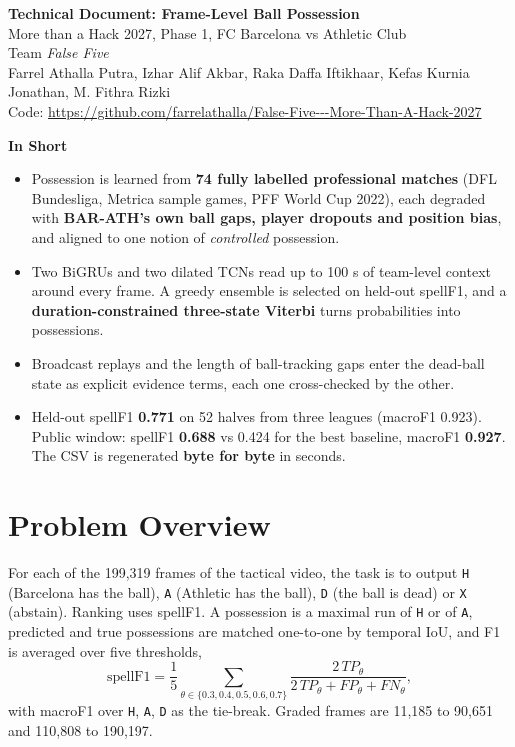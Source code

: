 \documentclass[10pt]{article}
\begin{document}
\begin{center}
{\Large \textbf{Technical Document: Frame-Level Ball Possession}}\\[3pt]
{\large More than a Hack 2027, Phase 1, FC Barcelona vs Athletic Club}\\[5pt]
Team \textit{False Five}\\[2pt]
Farrel Athalla Putra, Izhar Alif Akbar, Raka Daffa Iftikhaar, Kefas Kurnia Jonathan, M. Fithra Rizki\\[2pt]
\small Code: \url{https://github.com/farrelathalla/False-Five---More-Than-A-Hack-2027}
\end{center}

\begin{keybox}
\textbf{In Short}
\begin{itemize}[leftmargin=1.2em]
\item Possession is learned from \textbf{74 fully labelled professional matches} (DFL Bundesliga, Metrica sample games, PFF World Cup 2022), each degraded with \textbf{BAR-ATH's own ball gaps, player dropouts and position bias}, and aligned to one notion of \emph{controlled} possession.
\item Two BiGRUs and two dilated TCNs read up to 100 s of team-level context around every frame. A greedy ensemble is selected on held-out spellF1, and a \textbf{duration-constrained three-state Viterbi} turns probabilities into possessions.
\item Broadcast replays and the length of ball-tracking gaps enter the dead-ball state as explicit evidence terms, each one cross-checked by the other.
\item Held-out spellF1 \textbf{0.771} on 52 halves from three leagues (macroF1 0.923). Public window: spellF1 \textbf{0.688} vs 0.424 for the best baseline, macroF1 \textbf{0.927}. The CSV is regenerated \textbf{byte for byte} in seconds.
\end{itemize}
\end{keybox}

\section*{Problem Overview}
For each of the 199{,}319 frames of the tactical video, the task is to output \texttt{H} (Barcelona has the ball), \texttt{A} (Athletic has the ball), \texttt{D} (the ball is dead) or \texttt{X} (abstain). Ranking uses spellF1. A possession is a maximal run of \texttt{H} or of \texttt{A}, predicted and true possessions are matched one-to-one by temporal IoU, and F1 is averaged over five thresholds,
\begin{equation}
\text{spellF1} = \frac{1}{5}\sum_{\theta \in \{0.3,0.4,0.5,0.6,0.7\}} \frac{2\,TP_\theta}{2\,TP_\theta + FP_\theta + FN_\theta},
\end{equation}
with macroF1 over \texttt{H}, \texttt{A}, \texttt{D} as the tie-break. Graded frames are 11{,}185 to 90{,}651 and 110{,}808 to 190{,}197.
\end{document}

